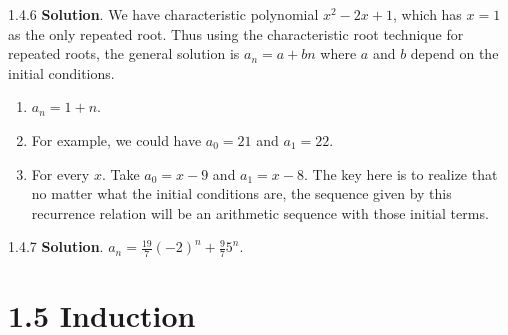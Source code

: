 \documentclass[11pt,]{book}
\theoremstyle{ptxplainnotitle}
\theoremstyle{ptxplaintitle}
\theoremstyle{ptxdefinitionnotitle}
\theoremstyle{ptxdefinitiontitle}
\theoremstyle{ptxdefinitionnotitle}
\theoremstyle{ptxdefinitiontitle}
\theoremstyle{ptxdefinitionnotitle}
\theoremstyle{ptxdefinitiontitle}
\theoremstyle{ptxdefinitiontitlenonumber}
\theoremstyle{ptxdefinitiontitlenonumber}
\numberwithin{equation}{chapter}
\begin{document}
\begin{divisionexercise}{1.4.6}
\textbf{Solution}.\quad%
\hypertarget{p-494}{}%
We have characteristic polynomial \(x^2 - 2x + 1\), which has \(x = 1\) as the only repeated root.  Thus using the characteristic root technique for repeated roots, the general solution is \(a_n = a + bn\) where \(a\) and \(b\) depend on the initial conditions. \leavevmode%
\begin{enumerate}[label=(\alph*)]
\item\hypertarget{li-227}{}\(a_n = 1 + n\).%
\item\hypertarget{li-228}{}\hypertarget{p-495}{}%
For example, we could have \(a_0 = 21\) and \(a_1 = 22\).%
\item\hypertarget{li-229}{}\hypertarget{p-496}{}%
For every \(x\).  Take \(a_0 = x-9\) and \(a_1 = x-8\).  The key here is to realize that no matter what the initial conditions are, the sequence given by this recurrence relation will be an arithmetic sequence with those initial terms.%
\end{enumerate}
%
\end{divisionexercise}%
\begin{divisionexercise}{1.4.7}
\textbf{Solution}.\quad%
\hypertarget{p-502}{}%
\(a_n = \frac{19}{7}(-2)^n + \frac{9}{7}5^n\text{.}\)%
\end{divisionexercise}%
\section*{1.5 Induction}
\end{document}
